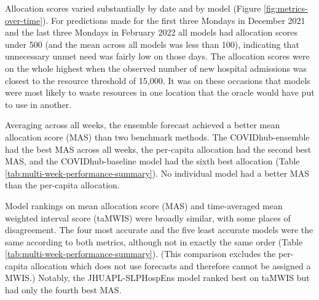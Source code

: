 \documentclass{article}\usepackage[]{graphicx}\usepackage[]{xcolor}
\begin{document}
Allocation scores varied substantially by date and by model (Figure \ref{fig:metrics-over-time}). For predictions made
for the first three Mondays in December 2021 and the last three Mondays in February 2022 all models had allocation
scores under 500 (and the mean across all models was less than 100), indicating that unnecessary unmet need was fairly
low on those days. The allocation scores were on the whole highest when the observed number of new hospital admissions
was closest to the resource threshold of 15,000.  It was on these occasions that models were most likely to waste resources
in one location that the oracle would have put to use in another.










Averaging across all weeks, the ensemble forecast achieved a better mean allocation score (MAS) than two benchmark
methods. The COVIDhub-ensemble had the best MAS across all weeks, the per-capita allocation had the second best MAS, and
the COVIDhub-baseline model had the sixth best allocation (Table \ref{tab:multi-week-performance-summary}). No
individual model had a better MAS than the per-capita allocation.

Model rankings on mean allocation score (MAS) and time-averaged mean weighted interval score
(taMWIS) were broadly similar, with some places of disagreement. The four most accurate and the five least accurate models were the same
according to both metrics, although not in exactly the same order (Table \ref{tab:multi-week-performance-summary}).
(This comparison excludes the per-capita allocation which does not use forecasts and therefore cannot be assigned a MWIS.)
Notably, the JHUAPL-SLPHospEns model ranked best on taMWIS but had only the fourth best MAS.
\end{document}
